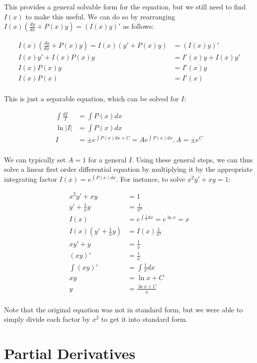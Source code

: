 \documentclass[12pt]{article}
\begin{document}
This provides a general solvable form for the equation, but we still need to find $I(x)$ to make this useful. We can do so by rearranging $I(x)(\frac{dy}{dx} + P(x)y) = (I(x)y)'$ as follows:

\begin{equation}
    \begin{split}
    I(x)(\frac{dy}{dx} + P(x)y) = I(x)(y'+P(x)y) &= (I(x)y)'\\
    I(x)y' + I(x)P(x)y &= I'(x)y+I(x)y'\\
    I(x)P(x)y &= I'(x)y\\
    I(x)P(x) &= I'(x)\\
    \end{split}
\end{equation}

This is just a separable equation, which can be solved for $I$:

\begin{equation}
    \begin{split}
        \int \frac{dI}{I} &= \int P(x) dx\\
        \ln |I| &= \int P(x) dx \\
        I  &= \pm e^{\int P(x) dx + C} = Ae^{\int P(x) dx}, A=\pm e^{C}\\
    \end{split}
\end{equation}

We can typically set $A=1$ for a general $I$. Using these general steps, we can thus solve a linear first order differential equation by multiplying it by the appropriate integrating factor $I(x) = e^{\int P(x) dx}$. For instance, to solve $x^2y'+xy=1$:

\begin{equation}
    \begin{split}
        x^2y'+xy &= 1\\
        y' + \frac{1}{x}y &= \frac{1}{x^2}\\
        I(x) &= e^{\int \frac{1}{x} dx} = e^{\ln x} = x\\
        I(x)(y' + \frac{1}{x}y) &= I(x)\frac{1}{x^2}\\
        xy'+y &= \frac{1}{x}\\
        (xy)' &= \frac{1}{x}\\
        \int (xy)' &= \int \frac{1}{x} dx\\
        xy &= \ln x + C\\
        y &= \frac{\ln x + C}{x}\\
    \end{split}
\end{equation}

Note that the original equation was not in standard form, but we were able to simply divide each factor by $x^2$ to get it into standard form.

\section{Partial Derivatives}
\end{document}
